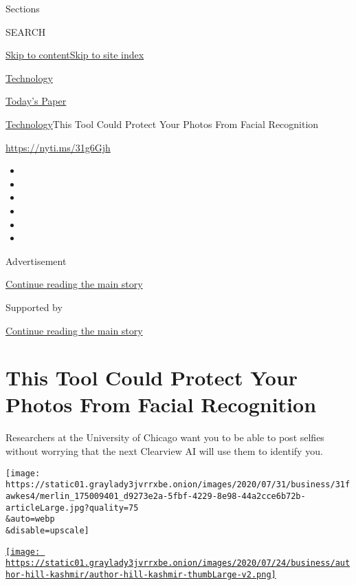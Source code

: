 Sections

SEARCH

\protect\hyperlink{site-content}{Skip to
content}\protect\hyperlink{site-index}{Skip to site index}

\href{https://www.nytimes3xbfgragh.onion/section/technology}{Technology}

\href{https://myaccount.nytimes3xbfgragh.onion/auth/login?response_type=cookie\&client_id=vi}{}

\href{https://www.nytimes3xbfgragh.onion/section/todayspaper}{Today's
Paper}

\href{/section/technology}{Technology}\textbar{}This Tool Could Protect
Your Photos From Facial Recognition

\href{https://nyti.ms/31g6Gjh}{https://nyti.ms/31g6Gjh}

\begin{itemize}
\item
\item
\item
\item
\item
\item
\end{itemize}

Advertisement

\protect\hyperlink{after-top}{Continue reading the main story}

Supported by

\protect\hyperlink{after-sponsor}{Continue reading the main story}

\hypertarget{this-tool-could-protect-your-photos-from-facial-recognition}{%
\section{This Tool Could Protect Your Photos From Facial
Recognition}\label{this-tool-could-protect-your-photos-from-facial-recognition}}

Researchers at the University of Chicago want you to be able to post
selfies without worrying that the next Clearview AI will use them to
identify you.

\texttt{[image: https://static01.graylady3jvrrxbe.onion/images/2020/07/31/business/31fawkes4/merlin\_175009401\_d9273e2a-5fbf-4229-8e98-44a2cce6b72b-articleLarge.jpg?quality=75\\\&auto=webp\\\&disable=upscale]}

\href{https://www.nytimes3xbfgragh.onion/by/kashmir-hill}{\texttt{[image: https://static01.graylady3jvrrxbe.onion/images/2020/07/24/business/author-hill-kashmir/author-hill-kashmir-thumbLarge-v2.png]}}

